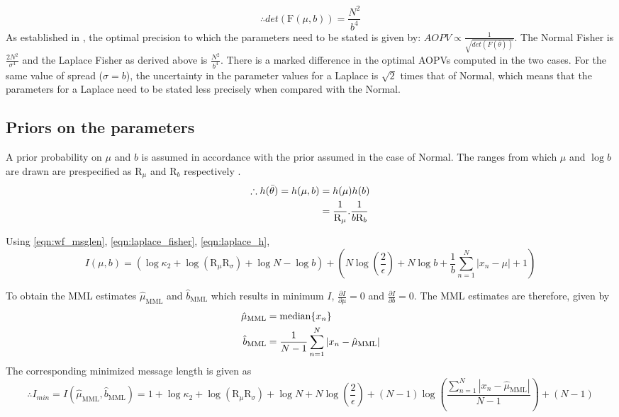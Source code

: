 \documentclass[wcp]{jmlr}
\begin{document}
\begin{equation} \therefore det(\mathrm{F}(\mu,b)) = \frac{N^2}{b^4} \label{eqn:laplace_fisher} \end{equation}
As established in \citet{oliver1994mml}, the optimal precision to which the parameters need
to be stated is given by: $AOPV \propto \frac{1}{\sqrt{det(F(\bar{\theta}))}}$.
The Normal Fisher is $\frac{2N^2}{\sigma^4}$ \citep{WallaceBook} and the Laplace Fisher 
as derived above is $\frac{N^2}{b^4}$. There is a marked difference in the optimal AOPVs
computed in the two cases. For the same value of spread ($\sigma=b$), the uncertainty in
the parameter values for a Laplace is $\sqrt{2}$ times that of Normal, which means
that the parameters for a Laplace need to be stated less precisely when compared with the Normal.

\subsection*{Priors on the parameters}
A prior probability on $\mu$ and $b$ is assumed in accordance with the prior assumed
in the case of Normal. The ranges from which $\mu$ and $\log b$ are drawn are prespecified as 
$\mathrm{R}_{\mu}$ and $\mathrm{R}_{b}$ respectively \citep{WallaceBook}. 
\begin{align} 
\therefore h(\bar{\theta}) = h(\mu,b) &= h(\mu) h(b) \notag\\
      &= \frac{1}{\mathrm{R}_{\mu}}. \frac{1}{b \mathrm{R}_{b}} \label{eqn:laplace_h} 
\end{align}

Using \eqref{eqn:wf_msglen}, \eqref{eqn:laplace_fisher}, \eqref{eqn:laplace_h},
\begin{dmath*}
 I(\mu,b) = \left( \log\kappa_2 + \log(\mathrm{R}_{\mu}\mathrm{R}_{\sigma}) + \log N - \log b \right) + \left( N\log\left(\frac{2}{\epsilon}\right) + N\log b + \frac{1}{b}\sum_{n=1}^N |x_n-\mu| + 1 \right)
\end{dmath*} 

\noindent To obtain the MML estimates $\hat{\mu}_{\mathrm{MML}}$ and $\hat{b}_{\mathrm{MML}}$ 
which results in minimum $I$, $\frac{\partial I}{\partial \mu} = 0$ and 
$\frac{\partial I}{\partial b} = 0$. The MML estimates are therefore, given by
\begin{align}
  \hat{\mu}_{\mathrm{MML}} &= \mathrm{median}\{x_n\} \notag\\
  \hat{b}_{\mathrm{MML}} &= \frac{1}{N-1} \sum_{n=1}^N |x_n-\hat{\mu}_{\mathrm{MML}}| 
  \label{eqn:laplace_estimate}
\end{align}
The corresponding minimized message length is given as
\begin{dmath}
 \therefore I_{min} = I(\hat{\mu}_{\mathrm{MML}},\hat{b}_{\mathrm{MML}}) = 1 + \log\kappa_2 + \log(\mathrm{R}_{\mu}\mathrm{R}_{\sigma}) + \log N + N\log\left(\frac{2}{\epsilon}\right) + (N-1) \log \left( \frac{\sum_{n=1}^N |x_n-\hat{\mu}_{\mathrm{MML}}|}{N-1} \right) + (N-1) \label{eqn:laplace_mml_estimate}
\end{dmath} 
\end{document}
